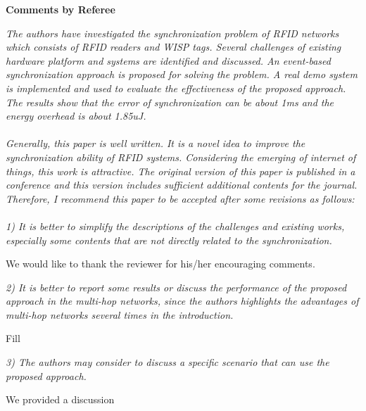 \documentclass[10pt]{article}
\newcommand{\referee}[1]{
	{\item \color{OliveGreen} \emph{{#1}}}
	\label{R\therefereeCounter:\arabic{enumi}}
}
\newcommand{\response}[1]{{\color{blue} #1}}
\newcounter{refereeCounter}
\newenvironment{responses}{%
\refstepcounter{refereeCounter}%
\textbf{\large Comments by Referee \therefereeCounter}
\begin{enumerate}%
\renewcommand{\labelenumi}{\textbf{[R\therefereeCounter :\,\arabic{enumi}]}} %
}{\end{enumerate}}
\begin{document}
\begin{responses}
	
\referee{The authors have investigated the synchronization problem of RFID networks which consists of RFID readers and WISP tags. Several challenges of existing hardware platform and systems are identified and discussed. An event-based synchronization approach is proposed for solving the problem. A real demo system is implemented and used to evaluate the effectiveness of the proposed approach. The results show that the error of synchronization can be about 1ms and the energy overhead is about 1.85uJ. \\
\\
Generally, this paper is well written. It is a novel idea to improve the synchronization ability of RFID systems. Considering the emerging of internet of things, this work  is attractive.  The original version of this paper is published in a conference and this version includes sufficient additional contents for the journal. Therefore, I recommend this paper to be accepted after some revisions as follows:  \\
\\
1) It is better to simplify the descriptions of the challenges and existing works, especially some contents that are not directly related to the synchronization.}
	
\response{
	We would like to thank the reviewer for his/her encouraging comments.
}

\referee{2) It is better to report some results or discuss the performance of the proposed approach in the multi-hop networks, since the authors highlights the advantages of  multi-hop networks several times in the introduction.}
	
\response{
	Fill
}
	
\referee{3) The authors may consider to discuss a specific scenario that can use the proposed approach.}
	
\response{
	We provided a discussion 
}

\end{responses}
\end{document}
